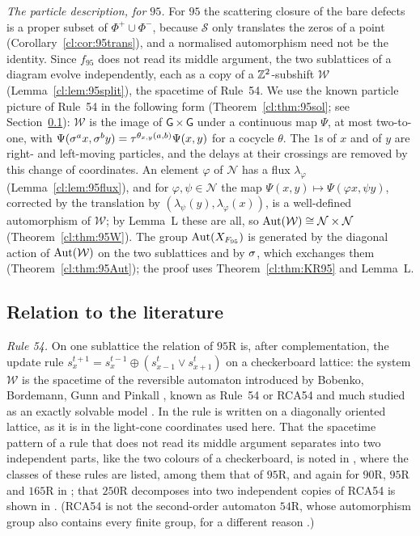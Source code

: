 \emph{The particle description, for $95$.} For $95$ the scattering closure of the bare defects is a proper subset of $\Phi^+\cup\Phi^-$, because $\mathcal S$ only translates the zeros of a point (Corollary~\ref{cl:cor:95trans}), and a normalised automorphism need not be the identity. Since $f_{95}$ does not read its middle argument, the two sublattices of a diagram evolve independently, each as a copy of a $\mathbb{Z}^2$-subshift $\mathcal W$ (Lemma~\ref{cl:lem:95split}), the spacetime of Rule~54. We use the known particle picture of Rule~54 \cite{BBGP1993} in the following form (Theorem~\ref{cl:thm:95sol}; see Section~\ref{sec:lit}): $\mathcal W$ is the image of $\mathsf G\times\mathsf G$ under a continuous map $\Psi$, at most two-to-one, with $\Psi(\sigma^ax,\sigma^by)=\tau^{\theta_{x,y}(a,b)}\Psi(x,y)$ for a cocycle $\theta$. The $1$s of $x$ and of $y$ are right- and left-moving particles, and the delays at their crossings are removed by this change of coordinates. An element $\varphi$ of $\mathcal N$ has a flux $\lambda_\varphi$ (Lemma~\ref{cl:lem:95flux}), and for $\varphi,\psi\in\mathcal N$ the map $\Psi(x,y)\mapsto\Psi(\varphi x,\psi y)$, corrected by the translation by $(\lambda_\psi(y),\lambda_\varphi(x))$, is a well-defined automorphism of $\mathcal W$; by Lemma~L these are all, so $\operatorname{Aut}(\mathcal W)\cong\mathcal N\times\mathcal N$ (Theorem~\ref{cl:thm:95W}). The group $\operatorname{Aut}(X_{F_{95}})$ is generated by the diagonal action of $\operatorname{Aut}(\mathcal W)$ on the two sublattices and by $\sigma$, which exchanges them (Theorem~\ref{cl:thm:95Aut}); the proof uses Theorem~\ref{cl:thm:KR95} and Lemma~L.

\subsection{Relation to the literature}\label{sec:lit}

\emph{Rule 54.} On one sublattice the relation of $95$R is, after complementation, the update rule $s_x^{t+1}=s_x^{t-1}\oplus(s_{x-1}^t\vee s_{x+1}^t)$ on a checkerboard lattice: the system $\mathcal W$ is the spacetime of the reversible automaton introduced by Bobenko, Bordemann, Gunn and Pinkall \cite{BBGP1993}, known as Rule~54 or RCA54 and much studied as an exactly solvable model \cite{BKP2021}. In \cite{BBGP1993} the rule is written on a diagonally oriented lattice, as it is in the light-cone coordinates used here. That the spacetime pattern of a rule that does not read its middle argument separates into two independent parts, like the two colours of a checkerboard, is noted in \cite[p.~386]{Takesue1989}, where the classes of these rules are listed, among them that of $95$R, and again for $90$R, $95$R and $165$R in \cite[Section~4]{Takesue1995}; that $250$R decomposes into two independent copies of RCA54 is shown in \cite[Section~3.1]{IT2018}. (RCA54 is not the second-order automaton $54$R, whose automorphism group also contains every finite group, for a different reason \cite{PaperC}.)

